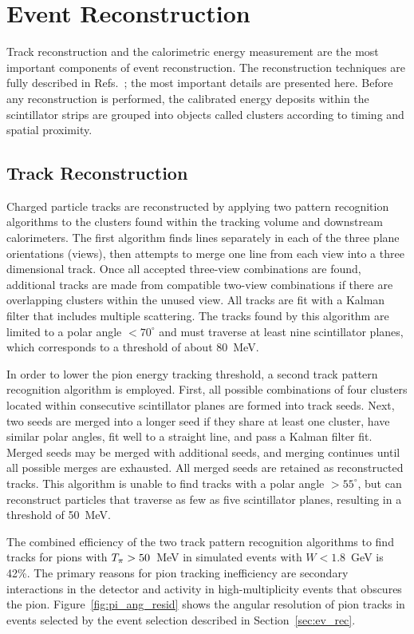 \section{Event Reconstruction}
\label{sec:reco}
Track reconstruction and the calorimetric energy measurement are the most important components of \ccpi event 
reconstruction.  The reconstruction techniques are fully described in Refs.~\cite{minerva_nim,pittir20853}; the 
most important details are presented here.  Before any reconstruction is performed, the calibrated energy 
deposits within the scintillator strips are grouped into objects called clusters according to timing and spatial proximity.  

\subsection{Track Reconstruction}

Charged particle tracks are reconstructed by applying two pattern recognition algorithms to the clusters found within the tracking volume and downstream calorimeters. 
The first algorithm finds lines separately in each of the three plane orientations (views), then 
attempts to merge one line from each view into a three dimensional track.  Once all accepted three-view 
combinations are found, additional tracks are made from compatible two-view 
combinations if there are overlapping clusters within the unused view.  All tracks are fit 
with a Kalman filter that includes multiple scattering.  The tracks found by 
this algorithm are limited to a polar angle $<70^{\circ}$ 
and must traverse at least nine scintillator planes, 
which corresponds to a \Tpi threshold of about 80~MeV.

In order to lower the pion energy tracking threshold, a second track pattern recognition 
algorithm is employed.  First, all possible combinations of four clusters located within consecutive scintillator planes are formed into track seeds.  
Next, two seeds are merged into a longer seed if they share at least one 
cluster, have similar polar angles, fit well to a straight line, and pass a Kalman filter fit.  Merged seeds may 
be merged with additional seeds, and merging continues until all possible merges are exhausted.  All merged seeds are 
retained as reconstructed tracks.  This algorithm is unable to find tracks with 
a polar angle $>55^{\circ}$, but can reconstruct particles that traverse as few as five scintillator planes, 
resulting in a \Tpi threshold of 50~MeV.  

The combined efficiency of the two track pattern recognition 
algorithms to find tracks for pions with $T_{\pi}>50$~MeV in simulated \ccpi events with $W<1.8$~GeV is 42\%.  The primary 
reasons for pion tracking inefficiency are secondary interactions in the detector and activity in high-multiplicity events that 
obscures the pion.  Figure~\ref{fig:pi_ang_resid} shows the angular resolution of
pion tracks in \ccpi events selected by the event selection described in Section~\ref{sec:ev_rec}.  


